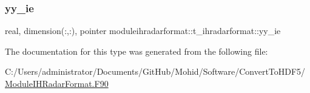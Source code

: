 \mbox{\label{structmoduleihradarformat_1_1t__ihradarformat_aba0d599820ce9086070fe76c90d704a2}} 
\subsubsection{\texorpdfstring{yy\+\_\+ie}{yy\_ie}}
{\footnotesize\ttfamily real, dimension(\+:,\+:), pointer moduleihradarformat\+::t\+\_\+ihradarformat\+::yy\+\_\+ie\hspace{0.3cm}{\ttfamily [private]}}



The documentation for this type was generated from the following file\+:\begin{DoxyCompactItemize}
\item 
C\+:/\+Users/administrator/\+Documents/\+Git\+Hub/\+Mohid/\+Software/\+Convert\+To\+H\+D\+F5/\mbox{\hyperlink{_module_i_h_radar_format_8_f90}{Module\+I\+H\+Radar\+Format.\+F90}}\end{DoxyCompactItemize}
